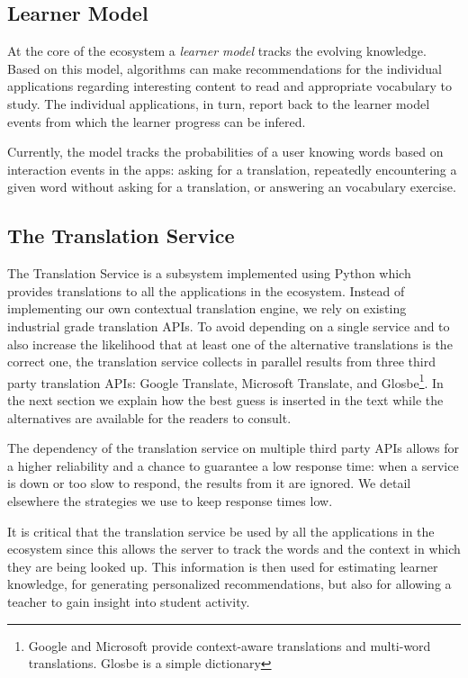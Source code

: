 \subsection{Learner Model}

At the core of the ecosystem a {\em learner model} tracks the evolving knowledge. 
Based on this model, algorithms can make recommendations for the individual applications regarding interesting content to read and appropriate vocabulary to study. The individual applications, in turn, report back to the learner model events from which the learner progress can be infered. 

Currently, the model tracks the probabilities of a user knowing words based on interaction events in the apps: asking for a translation, repeatedly encountering a given word without asking for a translation, or answering an vocabulary exercise.


\subsection{The Translation Service}

The Translation Service is a subsystem implemented using Python which provides translations to all the applications in the ecosystem. Instead of implementing our own contextual translation engine, we rely on existing industrial grade translation APIs. To avoid depending on a single service and to also increase the likelihood that at least one of the alternative translations is the correct one, the translation service collects in parallel results from three third party translation APIs: Google Translate, Microsoft Translate, and Glosbe\footnote{Google and Microsoft provide context-aware translations and multi-word translations. Glosbe is a simple dictionary}. \cite{Jager17-mux} In the next section we explain how the best guess is inserted in the text while the alternatives are available for the readers to consult.

The dependency of the translation service on multiple third party APIs allows for a higher reliability and a chance to guarantee a low response time: when a service is down or too slow to respond, the results from it are ignored. We detail elsewhere the strategies we use to keep response times low\cite{Jager17-mux}.

It is critical that the translation service be used by all the applications in the ecosystem since this allows the server to track the words and the context in which they are being looked up. This information is then used for estimating learner knowledge, for generating personalized recommendations, but also for allowing a teacher to gain insight into student activity.


